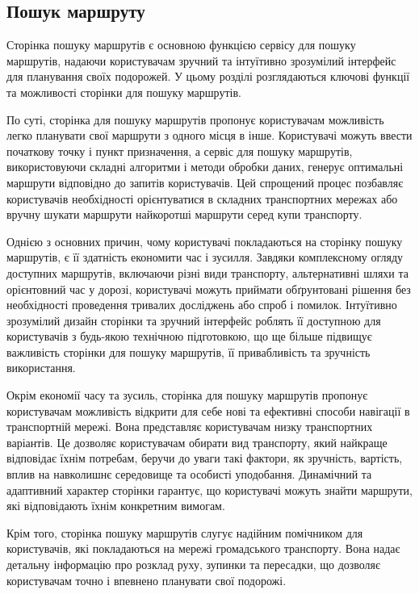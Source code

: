 \subsection{Пошук маршруту}
\label{subsec:route-search-subsection}

Сторінка пошуку маршрутів є основною функцією сервісу для пошуку маршрутів, надаючи користувачам зручний та інтуїтивно зрозумілий інтерфейс для планування своїх подорожей. У цьому розділі розглядаються ключові функції та можливості сторінки для пошуку маршрутів.

По суті, сторінка для пошуку маршрутів пропонує користувачам можливість легко планувати свої маршрути з одного місця в інше. Користувачі можуть ввести початкову точку і пункт призначення, а сервіс для пошуку маршрутів, використовуючи складні алгоритми і методи обробки даних, генерує оптимальні маршрути відповідно до запитів користувачів. Цей спрощений процес позбавляє користувачів необхідності орієнтуватися в складних транспортних мережах або вручну шукати маршрути найкоротші маршрути серед купи транспорту.

Однією з основних причин, чому користувачі покладаються на сторінку пошуку маршрутів, є її здатність економити час і зусилля. Завдяки комплексному огляду доступних маршрутів, включаючи різні види транспорту, альтернативні шляхи та орієнтовний час у дорозі, користувачі можуть приймати обґрунтовані рішення без необхідності проведення тривалих досліджень або спроб і помилок. Інтуїтивно зрозумілий дизайн сторінки та зручний інтерфейс роблять її доступною для користувачів з будь-якою технічною підготовкою, що ще більше підвищує важливість сторінки для пошуку маршрутів, її привабливість та зручність використання.

Окрім економії часу та зусиль, сторінка для пошуку маршрутів пропонує користувачам можливість відкрити для себе нові та ефективні способи навігації в транспортній мережі. Вона представляє користувачам низку транспортних варіантів. Це дозволяє користувачам обирати вид транспорту, який найкраще відповідає їхнім потребам, беручи до уваги такі фактори, як зручність, вартість, вплив на навколишнє середовище та особисті уподобання. Динамічний та адаптивний характер сторінки гарантує, що користувачі можуть знайти маршрути, які відповідають їхнім конкретним вимогам.

Крім того, сторінка пошуку маршрутів слугує надійним помічником для користувачів, які покладаються на мережі громадського транспорту. Вона надає детальну інформацію про розклад руху, зупинки та пересадки, що дозволяє користувачам точно і впевнено планувати свої подорожі.

